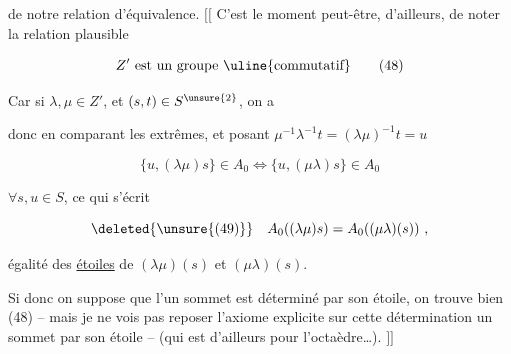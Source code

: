 
de notre relation d'équivalence. $[\![$ C'est le moment peut-être, d'ailleurs, de noter la relation plausible

\[
Z'\text{ est un groupe \uline{commutatif}}
\tag*{$(48)$}
\]


Car si $\lambda,\mu\in Z'$, et $(s,t)\in S^{\unsure{2}}$, on a


donc en comparant les extrêmes, et posant $\mu^{-1}\lambda^{-1}t=(\lambda\mu)^{-1}t=u$

\[
\{u,(\lambda\mu)s\}\in A_0\Longleftrightarrow\{u,(\mu\lambda)s\}\in A_0
\]

$\forall s,u\in S$, ce qui s'écrit 

\[
\deleted{\unsure{(49)}}\quad A_0((\lambda\mu)s)=A_0((\mu\lambda)(s))\ ,
\]

égalité des \uline{étoiles} de $(\lambda\mu)(s)$ et $(\mu\lambda)(s)$.


Si donc on suppose que l'un sommet est déterminé par son étoile, on trouve bien (48) -- mais je ne vois pas  reposer l'axiome explicite sur cette détermination un sommet par son étoile -- (qui est d'ailleurs  pour l'octaèdre\ldots). $]\!]$


